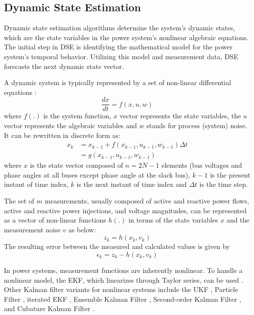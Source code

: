 \subsection{Dynamic State Estimation}

Dynamic state estimation algorithms determine the system's dynamic states, which are the state variables in the power system's nonlinear algebraic equations. The initial step in DSE is identifying the mathematical model for the power system's temporal behavior. Utilizing this model and measurement data, DSE forecasts the next dynamic state vector.

A dynamic system is typically represented by a set of non-linear differential equations \autocite{4510059, 5871327}:
\begin{equation}
    \frac{d x}{d t}=f(x, u, w)
    \label{eq:dynamic_eq}
\end{equation}
where $f(.)$ is the system function, $x$ vector represents the state variables, the $u$ vector represents the algebraic variables and $w$ stands for process (system) noise. It can be rewritten in discrete form as:
\begin{equation}
    \begin{aligned}
x_{k} & =x_{k-1}+f\left(x_{k-1}, u_{k-1}, w_{k-1}\right) \Delta t \\
& =g\left(x_{k-1}, u_{k-1}, w_{k-1}\right)
\end{aligned}
\end{equation}
where $x$ is the state vector composed of $n = 2N-1$ elements (bus voltages and  phase angles at all buses except phase angle at the slack bus), $k-1$ is the present instant of time index, $k$ is the next instant of time index  and $\Delta t$ is the time step.

The set of $m$ measurements, usually composed of active and reactive power flows, active and reactive power injections, and voltage magnitudes, can be represented as a vector of non-linear functions $h(.)$ in terms of the state variables $x$ and the measurement noise $v$ as below:
\begin{equation}
    z_{k}=h\left(x_{k}, v_{k}\right)
\end{equation}
The resulting error between the measured and calculated values is given by
\begin{equation}
    \epsilon_{k}=z_{k}-h\left(x_{k}, v_{k}\right)
\end{equation}

In power systems, measurement functions are inherently nonlinear. To handle a nonlinear model, the EKF, which linearizes through Taylor series, can be used \autocite{Jin_2021}. Other Kalman filter variants for nonlinear systems include the UKF \autocite{Valverde2011}, Particle Filter \autocite{DELMORAL1997653}, iterated EKF \autocite{BRETAS198970}, Ensemble Kalman Filter \autocite{Houtekamer_Mitchell_1998}, Second-order Kalman Filter \autocite{Nash_Gelb_Kasper_1974}, and Cubature Kalman Filter \autocite{BASETTI2022100712}.

